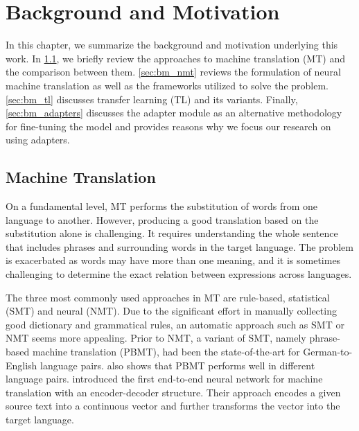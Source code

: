 \chapter{Background and Motivation}

In this chapter, we summarize the background and motivation underlying this work. In \cref{sec:bm_smt}, we briefly review the approaches to machine translation (MT) and the comparison between them.
\cref{sec:bm_nmt} reviews the formulation of neural machine translation as well as the frameworks utilized to solve the problem.
\cref{sec:bm_tl} discusses transfer learning (TL) and its variants.
Finally, \cref{sec:bm_adapters} discusses the adapter module as an alternative methodology for fine-tuning the model and provides reasons why we focus our research on using adapters.

\section{Machine Translation}
\label{sec:bm_smt}
On a fundamental level, MT performs the substitution of words from one language to another. However, producing a good translation based on the substitution alone is challenging. It requires understanding the whole sentence that includes phrases and surrounding words in the target language. The problem is exacerbated as words may have more than one meaning, and it is sometimes challenging to determine the exact relation between expressions across languages.

The three most commonly used approaches in MT are rule-based, statistical (SMT) and neural (NMT). Due to the significant effort in manually collecting good dictionary and grammatical rules, an automatic approach such as SMT or NMT seems more appealing.
Prior to NMT, a variant of SMT, namely phrase-based machine translation (PBMT), had been the state-of-the-art for German-to-English language pairs.  also shows that PBMT performs well in different language pairs.  introduced the first end-to-end neural network for machine translation with an encoder-decoder structure. Their approach encodes a given source text into a continuous vector and further transforms the vector into the target language.

